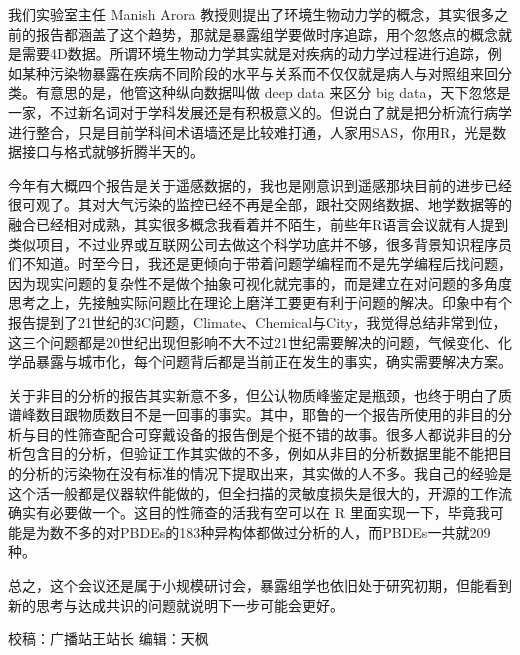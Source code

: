 \documentclass[]{book}
\begin{document}
我们实验室主任 Manish Arora 教授则提出了环境生物动力学的概念，其实很多之前的报告都涵盖了这个趋势，那就是暴露组学要做时序追踪，用个忽悠点的概念就是需要4D数据。所谓环境生物动力学其实就是对疾病的动力学过程进行追踪，例如某种污染物暴露在疾病不同阶段的水平与关系而不仅仅就是病人与对照组来回分类。有意思的是，他管这种纵向数据叫做 deep data 来区分 big data，天下忽悠是一家，不过新名词对于学科发展还是有积极意义的。但说白了就是把分析流行病学进行整合，只是目前学科间术语墙还是比较难打通，人家用SAS，你用R，光是数据接口与格式就够折腾半天的。

今年有大概四个报告是关于遥感数据的，我也是刚意识到遥感那块目前的进步已经很可观了。其对大气污染的监控已经不再是全部，跟社交网络数据、地学数据等的融合已经相对成熟，其实很多概念我看着并不陌生，前些年R语言会议就有人提到类似项目，不过业界或互联网公司去做这个科学功底并不够，很多背景知识程序员们不知道。时至今日，我还是更倾向于带着问题学编程而不是先学编程后找问题，因为现实问题的复杂性不是做个抽象可视化就完事的，而是建立在对问题的多角度思考之上，先接触实际问题比在理论上磨洋工要更有利于问题的解决。印象中有个报告提到了21世纪的3C问题，Climate、Chemical与City，我觉得总结非常到位，这三个问题都是20世纪出现但影响不大不过21世纪需要解决的问题，气候变化、化学品暴露与城市化，每个问题背后都是当前正在发生的事实，确实需要解决方案。

关于非目的分析的报告其实新意不多，但公认物质峰鉴定是瓶颈，也终于明白了质谱峰数目跟物质数目不是一回事的事实。其中，耶鲁的一个报告所使用的非目的分析与目的性筛查配合可穿戴设备的报告倒是个挺不错的故事。很多人都说非目的分析包含目的分析，但验证工作其实做的不多，例如从非目的分析数据里能不能把目的分析的污染物在没有标准的情况下提取出来，其实做的人不多。我自己的经验是这个活一般都是仪器软件能做的，但全扫描的灵敏度损失是很大的，开源的工作流确实有必要做一个。这目的性筛查的活我有空可以在 R 里面实现一下，毕竟我可能是为数不多的对PBDEs的183种异构体都做过分析的人，而PBDEs一共就209种。

总之，这个会议还是属于小规模研讨会，暴露组学也依旧处于研究初期，但能看到新的思考与达成共识的问题就说明下一步可能会更好。

校稿：广播站王站长
编辑：天枫


\end{document}
